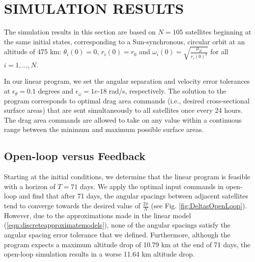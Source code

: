\documentclass[letterpaper, 10 pt, conference]{ieeeconf}  %
\begin{document}
\section{SIMULATION RESULTS}

\iffalse 
We take inspiration from the Planet Doves constellation which employs about a hundred 3U-size satellites in a sun-synchronous, low Earth orbit at an ideal altitude of 475 km. The satellites are launched from a single launch vehicle after which they are phased apart into an equally-spaced constellation. In our problem, we also assume that all satellites begin at the same angular position in a 475 km Sun-synchronous circular orbit. The launch vehicle ejects each satellite at a different orientation with respect to the orbital motion. Once fully deployed, the constellation would resemble a cluster with each satellite having a slightly different radial position, angular position and velocity with respect to a reference line in the orbital plane. \fi

The simulation results in this section are based on $N = 105$ satellites beginning at the same initial states, corresponding to a Sun-synchronous, circular orbit at an altitude of 475 km: $\theta_i(0) = 0$, $r_i(0) = r_0 $ and $\omega_{i}(0) = \sqrt{\tfrac{\mu_{\scriptscriptstyle E}}{r_i(0)^3}}$ for all $i = 1, \ldots, N$. 

In our linear program, we set the angular separation and velocity error tolerances at $\epsilon_{\theta} = 0.1$ degrees and $\epsilon_{\omega} = 1e\text{-}18$ rad/s, respectively. The solution to the program corresponds to optimal drag area commands (i.e., desired cross-sectional surface areas) that are sent simultaneously to all satellites once every 24 hours. The drag area commands are allowed to take on any value within a continuous range between the minimum and maximum possible surface areas. 

\subsection{Open-loop versus Feedback}

Starting at the initial conditions, we determine that the linear program is feasible with a horizon of $T = 71 $ days. We apply the optimal input commands in open-loop and find that after 71 days, the angular spacings between adjacent satellites tend to converge towards the desired value of $\frac{2\pi}{N}$ (see  Fig. \ref{fig:DeltasOpenLoop}). However, due to the approximations made in the linear model (\ref{eqn:discreteapproximatemodels}), none of the angular spacings satisfy the angular spacing error tolerance that we defined. Furthermore, although the program expects a maximum altitude drop of 10.79 km at the end of 71 days, the open-loop simulation results in a worse 11.64 km altitude drop.
\end{document}
